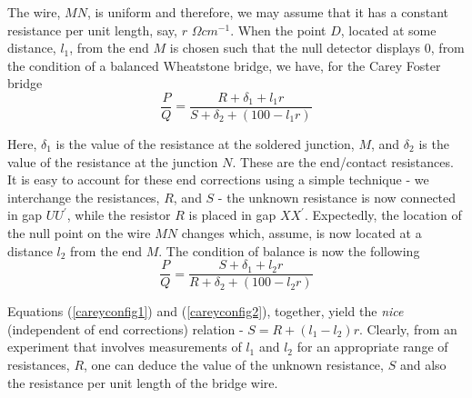 The wire, $MN$, is uniform and therefore, we may assume that it has a constant resistance per unit length, say, $r$ $ \Omega cm^{-1}$. When the point $D$, located at some distance, $l_1$, from the end $M$ is chosen such that the null detector displays $0$, from the condition of a balanced Wheatstone bridge, we have, for the Carey Foster bridge 
\begin{equation}
\frac{P}{Q}=\frac{R+\delta_{1}+l_{1}r}{S+\delta_{2}+(100-l_{1}r)}
\label{careyconfig1}
\end{equation}

Here, $\delta_{1}$ is the value of the resistance at the soldered junction, $M$, and $\delta_{2}$ is the value of the resistance at the junction $N$. These are the end/contact resistances. It is easy to account for these end corrections using a simple technique - we interchange the resistances, $R$, and $S$ - the unknown resistance is now connected in gap $UU^{\prime}$, while the resistor $R$ is placed in gap $XX^{\prime}$. Expectedly, the location of the null point on the wire $MN$ changes which, assume, is now located at a distance $l_2$ from the end $M$. The condition of balance is now the following
\begin{equation}
\frac{P}{Q}=\frac{S+\delta_{1}+l_{2}r}{R+\delta_{2}+(100-l_{2}r)}
\label{careyconfig2}
\end{equation}

Equations (\ref{careyconfig1}) and (\ref{careyconfig2}), together, yield the \textit{nice} (independent of end corrections) relation - 
$S = R + (l_1-l_2)r$. Clearly, from an experiment that involves measurements of $l_1$ and $l_2$ for an appropriate range of resistances, $R$, one can deduce the value of the unknown resistance, $S$ and also the resistance per unit length of the bridge wire. 
\\

